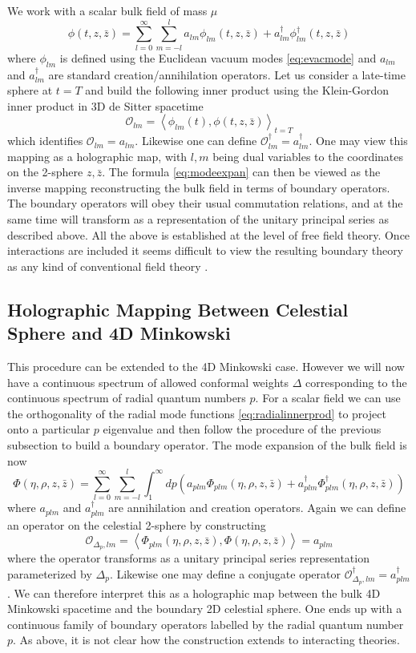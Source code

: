 \documentclass{brownthesis}
\begin{document}
We work with a scalar bulk field of mass $\mu$
\begin{equation}
\phi(t,z,\bar{z})=\sum_{l=0}^{\infty}\sum_{m=-l}^{l}a_{lm}\phi_{lm}(t,z,\bar{z})+a_{lm}^{\dagger}\phi_{lm}^{\dagger}(t,z,\bar{z})\label{eq:modeexpan}
\end{equation}
where $\phi_{lm}$ is defined using the Euclidean vacuum modes \eqref{eq:evacmode}
and $a_{lm}$ and $a_{lm}^{\dagger}$ are standard creation/annihilation
operators. Let us consider a late-time sphere at $t=T$ and build
the following inner product using the Klein-Gordon inner product in
3D de Sitter spacetime
\[
\mathcal{O}_{lm}=\left\langle \phi_{lm}(t),\phi(t,z,\bar{z})\right\rangle _{t=T}
\]
which identifies $\mathcal{O}_{lm}=a_{lm}$. Likewise one can define
$\mathcal{O}_{lm}^{\dagger}=a_{lm}^{\dagger}$. One may view this
mapping as a holographic map, with $l,m$ being dual variables to
the coordinates on the 2-sphere $z,\bar{z}$. The formula \eqref{eq:modeexpan}
can then be viewed as the inverse mapping reconstructing the bulk
field in terms of boundary operators. The boundary operators will
obey their usual commutation relations, and at the same time will
transform as a representation of the unitary principal series as described
above. All the above is established at the level of free field theory.
Once interactions are included it seems difficult to view the resulting
boundary theory as any kind of conventional field theory \cite{PhysRevD.96.066031}.

\subsection{Holographic Mapping Between Celestial Sphere and 4D Minkowski}

This procedure can be extended to the 4D Minkowski case. However we
will now have a continuous spectrum of allowed conformal weights $\Delta$
corresponding to the continuous spectrum of radial quantum numbers
$p$. For a scalar field we can use the orthogonality of the radial
mode functions \eqref{eq:radialinnerprod} to project onto a particular
$p$ eigenvalue and then follow the procedure of the previous subsection
to build a boundary operator. The mode expansion of the bulk field
is now
\[
\Phi(\eta,\rho,z,\bar{z})=\sum_{l=0}^{\infty}\sum_{m=-l}^{l}\int_{1}^{\infty}dp\left(a_{plm}\Phi_{plm}(\eta,\rho,z,\bar{z})+a_{plm}^{\dagger}\Phi_{plm}^{\dagger}(\eta,\rho,z,\bar{z})\right)
\]
where $a_{plm}$ and $a_{plm}^{\dagger}$ are annihilation and creation
operators. Again we can define an operator on the celestial 2-sphere
by constructing
\[
\mathcal{O}_{\Delta_{p},lm}=\left\langle \Phi_{plm}(\eta,\rho,z,\bar{z}),\Phi(\eta,\rho,z,\bar{z})\right\rangle =a_{plm}
\]
where the operator transforms as a unitary principal series representation
parameterized by $\Delta_{p}$. Likewise one may define a conjugate
operator $\mathcal{O}_{\Delta_{p},lm}^{\dagger}=a_{plm}^{\dagger}$.
We can therefore interpret this as a holographic map between the bulk
4D Minkowski spacetime and the boundary 2D celestial sphere. One ends
up with a continuous family of boundary operators labelled by the
radial quantum number $p$. As above, it is not clear how the construction
extends to interacting theories.
\end{document}
